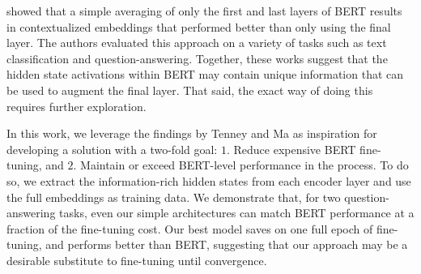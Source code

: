 \cite{ma2019universal} showed that a simple averaging of only the first and last layers of BERT results in contextualized embeddings that performed better than only using the final layer. The authors evaluated this approach on a variety of tasks such as text classification and question-answering. Together, these works suggest that the hidden state activations within BERT may contain unique information that can be used to augment the final layer. That said, the exact way of doing this requires further exploration.

In this work, we leverage the findings by Tenney and Ma as inspiration for developing a solution with a two-fold goal: $1.$ Reduce expensive BERT fine-tuning, and $2.$ Maintain or exceed BERT-level performance in the process. To do so, we extract the information-rich hidden states from each encoder layer and use the full embeddings as training data. We demonstrate that, for two question-answering tasks, even our simple architectures can match BERT performance at a fraction of the fine-tuning cost. Our best model saves on one full epoch of fine-tuning, and performs better than BERT, suggesting that our approach may be a desirable substitute to fine-tuning until convergence.
